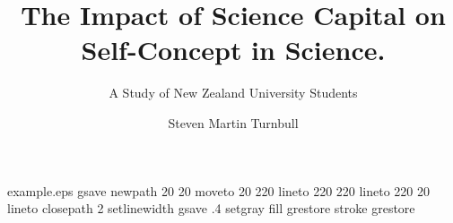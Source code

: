 %
%
%
%
%
\begin{filecontents*}{example.eps}
gsave
newpath
  20 20 moveto
  20 220 lineto
  220 220 lineto
  220 20 lineto
closepath
2 setlinewidth
gsave
  .4 setgray fill
grestore
stroke
grestore
\end{filecontents*}
%
\RequirePackage{fix-cm}
%
\documentclass[smallextended]{svjour3}       %
%
\smartqed  %
%
\usepackage{graphicx}
\usepackage{rotating}

%
%
%
%
%
\usepackage{afterpage}
\usepackage{csquotes}
\usepackage{lscape}


\title{The Impact of Science Capital on Self-Concept in Science.}


\subtitle{A Study of New Zealand University Students}


\author{Steven Martin Turnbull        %
}

